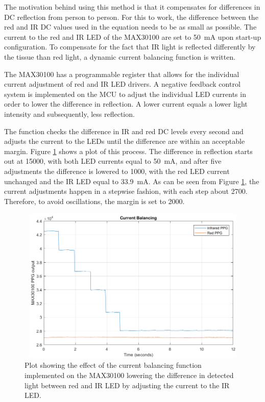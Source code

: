 The motivation behind using this method is that it compensates for differences in DC reflection from person to person. For this to work, the difference between the red and IR DC values used in the equation needs to be as small as possible. The current to the red and IR LED of the MAX30100 are set to \SI{50}{\milli\ampere} upon start-up configuration. To compensate for the fact that IR light is reflected differently by the tissue than red light, a dynamic current balancing function is written.

\medskip

The MAX30100 has a programmable register that allows for the individual current adjustment of red and IR LED drivers. A negative feedback control system is implemented on the MCU to adjust the individual LED currents in order to lower the difference in reflection. A lower current equals a lower light intensity and subsequently, less reflection.

The function checks the difference in IR and red DC levels every second and adjusts the current to the LEDs until the difference are within an acceptable margin. Figure \ref{fig:CurrentBalancing} shows a plot of this process. The difference in reflection starts out at 15000, with both LED currents equal to \SI{50}{\milli\ampere}, and after five adjustments the difference is lowered to 1000, with the red LED current unchanged and the IR LED equal to \SI{33.9}{\milli\ampere}. As can be seen from Figure \ref{fig:CurrentBalancing}, the current adjustments happen in a stepwise fashion, with each step about 2700. Therefore, to avoid oscillations, the margin is set to 2000.

\begin{figure}[H]
   \centering
   \includegraphics[width=12cm,height=7.5cm]{figs/CurrentBalancing.png}
   \caption{Plot showing the effect of the current balancing function implemented on the MAX30100 lowering the difference in detected light between red and IR LED by adjusting the current to the IR LED.}
   \label{fig:CurrentBalancing}
\end{figure}


